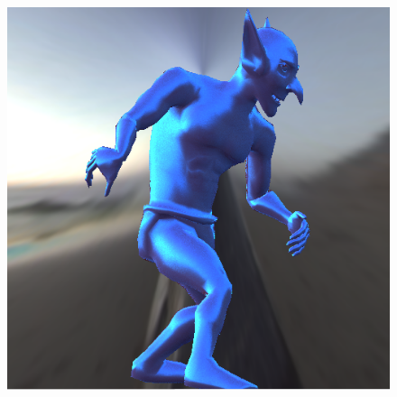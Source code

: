 \begin{figure}[H]
\endminipage\hfill
{}%
  \includegraphics[width=\linewidth]{./Imagens/brdfs/cook-torrance-goblin.png}
\endminipage
\end{figure}
